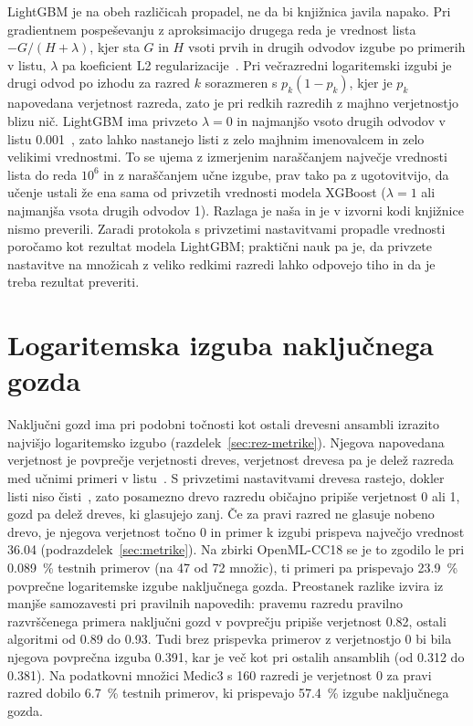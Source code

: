 \documentclass[a4paper,12pt,openright]{book}
\begin{document}
LightGBM je na obeh različicah propadel, ne da bi knjižnica javila napako. Pri
gradientnem pospeševanju z aproksimacijo drugega reda je vrednost lista
$-G/(H + \lambda)$, kjer sta $G$ in $H$ vsoti prvih in drugih odvodov izgube po
primerih v listu, $\lambda$ pa koeficient L2
regularizacije~\cite{chen2016xgboost}. Pri večrazredni logaritemski izgubi je
drugi odvod po izhodu za razred $k$ sorazmeren s $p_k(1 - p_k)$, kjer je $p_k$
napovedana verjetnost razreda, zato je pri redkih razredih z majhno verjetnostjo
blizu nič. LightGBM ima privzeto $\lambda = 0$ in najmanjšo vsoto drugih
odvodov v listu \num{0.001}~\cite{lightgbmdocs}, zato lahko nastanejo listi z
zelo majhnim imenovalcem in zelo velikimi vrednostmi. To se ujema z izmerjenim
naraščanjem največje vrednosti lista do reda $10^6$ in z naraščanjem učne
izgube, prav tako pa z ugotovitvijo, da učenje ustali že ena sama od privzetih
vrednosti modela XGBoost ($\lambda = 1$ ali najmanjša vsota drugih odvodov 1).
Razlaga je naša in je v izvorni kodi knjižnice nismo preverili. Zaradi
protokola s privzetimi nastavitvami propadle vrednosti poročamo kot rezultat
modela LightGBM; praktični nauk pa je, da privzete nastavitve na množicah z
veliko redkimi razredi lahko odpovejo tiho in da je treba rezultat preveriti.

\section{Logaritemska izguba naključnega gozda}
\label{sec:disk-rf}

Naključni gozd ima pri podobni točnosti kot ostali drevesni ansambli izrazito
najvišjo logaritemsko izgubo (razdelek~\ref{sec:rez-metrike}). Njegova
napovedana verjetnost je povprečje verjetnosti dreves, verjetnost drevesa pa je
delež razreda med učnimi primeri v listu~\cite{sklearndocsrf}. S privzetimi
nastavitvami drevesa
rastejo, dokler listi niso čisti~\cite{sklearndocsrf}, zato posamezno drevo
razredu običajno pripiše verjetnost 0 ali 1, gozd pa delež dreves, ki glasujejo
zanj. Če za pravi razred ne glasuje nobeno drevo, je njegova verjetnost točno 0
in primer k izgubi prispeva največjo vrednost \num{36.04}
(podrazdelek~\ref{sec:metrike}). Na zbirki OpenML-CC18 se je to zgodilo le pri
\SI{0.089}{\percent} testnih primerov (na 47 od 72 množic), ti primeri pa
prispevajo \SI{23.9}{\percent} povprečne logaritemske izgube naključnega gozda.
Preostanek razlike izvira iz manjše samozavesti pri pravilnih napovedih:
pravemu razredu pravilno razvrščenega primera naključni gozd v povprečju
pripiše verjetnost \num{0.82}, ostali algoritmi od \num{0.89} do \num{0.93}.
Tudi brez prispevka primerov z verjetnostjo 0 bi bila njegova povprečna izguba
\num{0.391}, kar je več kot pri ostalih ansamblih (od \num{0.312} do
\num{0.381}). Na podatkovni množici Medic3 s 160 razredi je verjetnost 0 za
pravi razred dobilo \SI{6.7}{\percent} testnih primerov, ki prispevajo
\SI{57.4}{\percent} izgube naključnega gozda.
\end{document}
